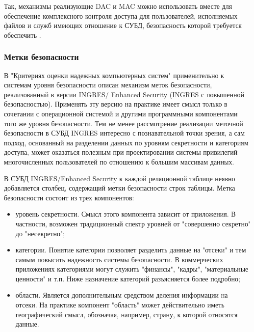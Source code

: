 Так, механизмы реализующие DAC и MAC можно использовать вместе для обеспечение комплексного контроля доступа
для пользователей, исполняемых файлов и служб имеющих отношение к СУБД, безопасность которой требуется
обеспечить \cite{selinux-apparmor}.


\subsubsection{Метки безопасности}

В "Критериях оценки надежных компьютерных систем" применительно к системам уровня безопасности
описан механизм меток безопасности, реализованный в версии INGRES/ Enhanced Security (INGRES с
повышенной безопасностью). Применять эту версию на практике имеет смысл только в сочетании с
операционной системой и другими программными компонентами того же уровня безопасности. Тем не менее
рассмотрение реализации меточной безопасности в СУБД INGRES интересно с познавательной точки
зрения, а сам подход, основанный на разделении данных по уровням секретности и категориям доступа,
может оказаться полезным при проектировании системы привилегий многочисленных пользователей по
отношению к большим массивам данных.

В СУБД INGRES/Enhanced Security к каждой реляционной таблице неявно добавляется столбец, содержащий
метки безопасности строк таблицы. Метка безопасности состоит из трех компонентов:
\begin{itemize}
    \item уровень секретности. Смысл этого компонента зависит от приложения. В частности, возможен
        традиционный спектр уровней от "совершенно секретно" до "несекретно";
    \item категории. Понятие категории позволяет разделить данные на "отсеки" и тем самым повысить
        надежность системы безопасности. В коммерческих приложениях категориями могут служить
        "финансы", "кадры", "материальные ценности" и т.п. Ниже назначение категорий разъясняется
        более подробно;
    \item области. Является дополнительным средством деления информации на отсеки. На практике
        компонент "область" может действительно иметь географический смысл, обозначая, например,
        страну, к которой относятся данные.
\end{itemize}

